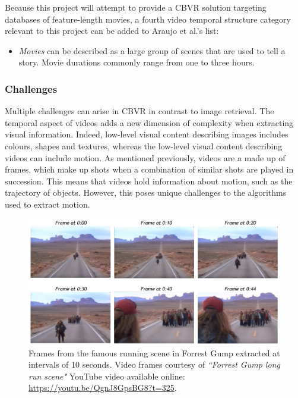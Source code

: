 \documentclass[11pt,openany,a4paper]{article}
\begin{document}
Because this project will attempt to provide a CBVR solution targeting databases of feature-length movies, a fourth video temporal structure category relevant to this project can be added to Araujo et al.'s list:
\begin{itemize}
    \item \textit{Movies} can be described as a large group of scenes that are used to tell a story. Movie durations commonly range from one to three hours.
\end{itemize}

\subsubsection{Challenges}
\label{sec:cbvr-challenges}

Multiple challenges can arise in CBVR in contrast to image retrieval. The temporal aspect of videos adds a new dimension of complexity when extracting visual information. Indeed, low-level visual content describing images includes colours, shapes and textures, whereas the low-level visual content describing videos can include motion. As mentioned previously, videos are a made up of frames, which make up shots when a combination of similar shots are played in succession. This means that videos hold information about motion, such as the trajectory of objects. However, this poses unique challenges to the algorithms used to extract motion.\\

\begin{figure}[h]
\centerline{\includegraphics[width=\textwidth]{figures/forrest_gump_shot.jpg}}
\caption{\label{fig:forrest_gump_frames}Frames from the famous running scene in Forrest Gump extracted at intervals of 10 seconds. Video frames courtesy of \textit{``Forrest Gump long run scene"} YouTube video available online: \url{https://youtu.be/QgnJ8GpsBG8?t=325}.}
\end{figure}
\end{document}
